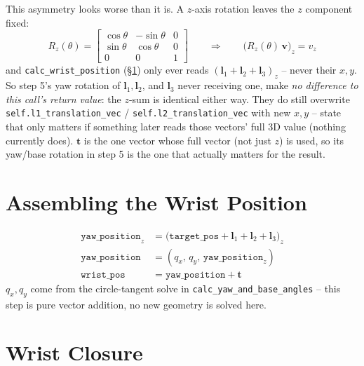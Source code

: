 \documentclass[11pt,a4paper]{article}
\begin{document}
This asymmetry looks worse than it is. A $z$-axis rotation leaves the $z$ component fixed:
\begin{equation}
R_z(\theta) = \begin{bmatrix}\cos\theta & -\sin\theta & 0\\ \sin\theta & \cos\theta & 0\\
0 & 0 & 1\end{bmatrix}
\qquad\Longrightarrow\qquad \big(R_z(\theta)\,\mathbf v\big)_z = v_z
\end{equation}
and \texttt{calc\_wrist\_position} (\S\ref{sec:assemble}) only ever reads
$(\mathbf l_1+\mathbf l_2+\mathbf l_3)_z$ -- never their $x,y$. So step 5's yaw rotation of
$\mathbf l_1,\mathbf l_2$, and $\mathbf l_3$ never receiving one, make \emph{no difference to
this call's return value}: the $z$-sum is identical either way. They do still overwrite
\texttt{self.l1\_translation\_vec} / \texttt{self.l2\_translation\_vec} with new $x,y$ --
state that only matters if something later reads those vectors' full 3D value (nothing
currently does). $\mathbf t$ is the one vector whose full vector (not just $z$) is used, so its
yaw/base rotation in step 5 is the one that actually matters for the result.

\section{Assembling the Wrist Position}
\label{sec:assemble}

\begin{align}
\texttt{yaw\_position}_z &= \big(\texttt{target\_pos} + \mathbf l_1+\mathbf l_2+\mathbf l_3\big)_z \\
\texttt{yaw\_position} &= (q_x,\, q_y,\, \texttt{yaw\_position}_z) \\
\texttt{wrist\_pos} &= \texttt{yaw\_position} + \mathbf t
\end{align}
$q_x,q_y$ come from the circle-tangent solve in \texttt{calc\_yaw\_and\_base\_angles} -- this
step is pure vector addition, no new geometry is solved here.

\section{Wrist Closure}
\end{document}
